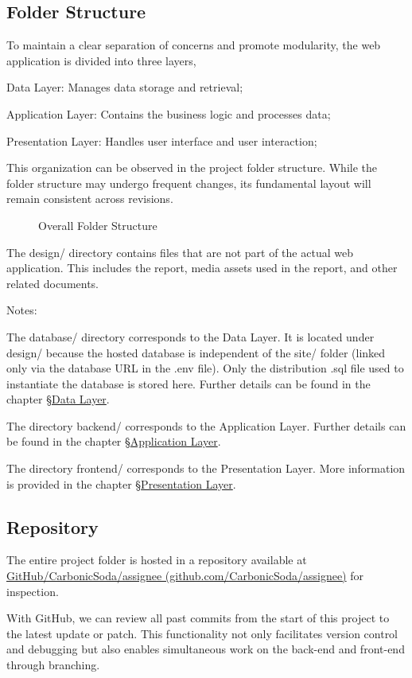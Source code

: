 \documentclass[12pt]{report}
\newcommand{\n}{\par}
\newcommand{\br}{\n\vspace{1 em}\n}
\begin{document}
\subsection{Folder Structure} \label{overview.project-structure.folder-structure}
To maintain a clear separation of concerns and promote modularity, the web application is divided into three layers,\n
Data Layer: Manages data storage and retrieval;\n
Application Layer: Contains the business logic and processes data;\n
Presentation Layer: Handles user interface and user interaction;
\br
This organization can be observed in the project folder structure.
While the folder structure may undergo frequent changes, its fundamental layout will remain consistent across revisions.
\newpage
\begin{figure}[h!]
	\centering
	\begin{minipage}{0.3\linewidth}
	\end{minipage}
	\caption{Overall Folder Structure}
	\label{fig:overview-folder-structure}
\end{figure}
\br
The design/ directory contains files that are not part of the actual web application.
This includes the report, media assets used in the report, and other related documents.
\br
Notes:\n
The database/ directory corresponds to the Data Layer.
It is located under design/ because the hosted database is independent of the site/ folder (linked only via the database URL in the .env file).
Only the distribution .sql file used to instantiate the database is stored here.
Further details can be found in the chapter \S \hyperref[data-layer]{Data Layer}.
\br
The directory backend/ corresponds to the Application Layer.
Further details can be found in the chapter \S \hyperref[application-layer]{Application Layer}.
\br
The directory frontend/ corresponds to the Presentation Layer.
More information is provided in the chapter \S \hyperref[presentation-layer]{Presentation Layer}.


\subsection{Repository} \label{overview.project-structure.repository}
The entire project folder is hosted in a repository available at
\href{https://github.com/CarbonicSoda/assignee}{GitHub/Carbonic\-Soda/assignee (github.com/CarbonicSoda/assignee)} for inspection.
\br
With GitHub, we can review all past commits from the start of this project to the latest update or patch.
This functionality not only facilitates version control and debugging but also enables simultaneous work on the back-end and front-end through branching.
\end{document}
